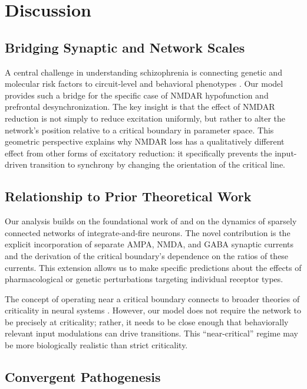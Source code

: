 \documentclass[11pt]{article}
\begin{document}
\section{Discussion}

\subsection{Bridging Synaptic and Network Scales}

A central challenge in understanding schizophrenia is connecting genetic and molecular risk factors to circuit-level and behavioral phenotypes \citep{schizophrenia2014biological}. Our model provides such a bridge for the specific case of NMDAR hypofunction and prefrontal desynchronization. The key insight is that the effect of NMDAR reduction is not simply to reduce excitation uniformly, but rather to alter the network's position relative to a critical boundary in parameter space. This geometric perspective explains why NMDAR loss has a qualitatively different effect from other forms of excitatory reduction: it specifically prevents the input-driven transition to synchrony by changing the orientation of the critical line.

\subsection{Relationship to Prior Theoretical Work}

Our analysis builds on the foundational work of \citet{brunel2000dynamics} and \citet{brunel2003fast} on the dynamics of sparsely connected networks of integrate-and-fire neurons. The novel contribution is the explicit incorporation of separate AMPA, NMDA, and GABA synaptic currents and the derivation of the critical boundary's dependence on the ratios of these currents. This extension allows us to make specific predictions about the effects of pharmacological or genetic perturbations targeting individual receptor types.

The concept of operating near a critical boundary connects to broader theories of criticality in neural systems \citep{beggs2003neuronal}. However, our model does not require the network to be precisely at criticality; rather, it needs to be close enough that behaviorally relevant input modulations can drive transitions. This ``near-critical'' regime may be more biologically realistic than strict criticality.

\subsection{Convergent Pathogenesis}
\end{document}
